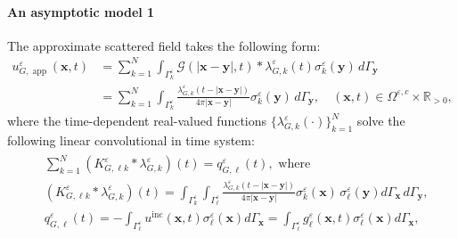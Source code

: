 \documentclass[]{article}
\numberwithin{equation}{section}
\numberwithin{theorem}{section}
\numberwithin{lemma}{section}
\numberwithin{corollary}{section}
\numberwithin{proposition}{section}
\numberwithin{definition}{section}
\newcommand{\bx}{\boldsymbol{x}}
\newcommand{\by}{\boldsymbol{y}}
\newcommand{\re}{\varepsilon}
\renewcommand{\vec}{\boldsymbol}
\begin{document}
	\paragraph{An asymptotic model 1}The approximate scattered field takes the following form:
	\begin{align}%
		\label{eq:ureg_sc}
		u^{\re}_{G,\operatorname{\operatorname{app}}} (\boldsymbol{x}, t) &= \sum_{k=1}^N \int_{\Gamma^{\re}_k} 
		\mathcal{G}( |\boldsymbol{x}-\boldsymbol{y}|,t)*\lambda^{\re}_{G,k}(t)  \sigma_k^{\re}(\boldsymbol{y}) \, d\Gamma_{\boldsymbol{y}}\\
		&= 
		\sum_{k=1}^N \int_{\Gamma^{\re}_k} 
		\frac{\lambda^{\re}_{G,k}(t-|\bx-\by |)}{4\pi | \bx-\by |}  \sigma_k^{\re}(\boldsymbol{y}) \, d\Gamma_{\boldsymbol{y}}, 
		\quad (\boldsymbol{x}, t) \in \Omega^{\re, c} \times \mathbb{R}_{>0},
	\end{align}
	where the time-dependent real-valued functions $ \{ \lambda^{\re}_{G,k}(\cdot) \}_{k=1}^N $ solve the following linear convolutional in time system:
	\begin{align}
		\label{eq:tdsys}
		\begin{split}
			& \sum_{k=1}^N (K^{\re}_{G,\ell k }*\lambda^{\re}_{G,k})(t)= q_{G,\ell }^{\re}(t), \text{ where }\\
			&(K^{\re}_{G,\ell k }*\lambda^{\re}_{G,k})(t)=\int_{\Gamma_k^{\re}}\int_{\Gamma_{\ell}^{\re}}\frac{\lambda^{\re}_{G,k}(t-|\bx-\by|)}{4\pi|\bx-\by|}\sigma_k^{\re}(\bx)\,\sigma_{\ell}^{\re}(\by)d\Gamma_{\bx}\, d\Gamma_{\by},\\
			&q^{\re}_{G, \ell}(t)=-\int_{\Gamma^{\re}_{\ell}} u^{\operatorname{inc}} (\boldsymbol{x}, t)
			\sigma_{\ell}^{\re}(\boldsymbol{x})d\Gamma_{\vec{x}} =\int_{\Gamma^{\re}_{\ell}} {g}^{\re}_{\ell}(\boldsymbol{x},t)
			\sigma_{\ell}^{\re}(\boldsymbol{x})d\Gamma_{\vec{x}},
		\end{split}
	\end{align}
\end{document}
